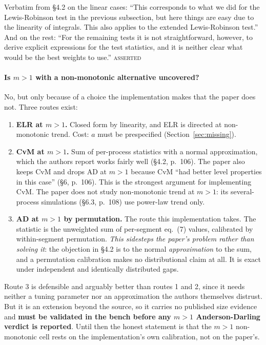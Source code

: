 \documentclass[11pt,a4paper]{article}
\newcommand{\ASSERTED}{\textsc{\textcolor{purple!70!black}{asserted}}}
\begin{document}
\medskip
\noindent
Verbatim from \S 4.2 on the linear cases: \enquote{This corresponds to what we did for the
Lewis-Robinson test in the previous subsection, but here things are easy due to the
linearity of integrals. This also applies to the extended Lewis-Robinson test.} And on
the rest: \enquote{For the remaining tests it is not straightforward, however, to derive
explicit expressions for the test statistics, and it is neither clear what would be the
best weights to use.} \ASSERTED

\paragraph{Is $m>1$ with a non-monotonic alternative uncovered?} No, but only because of
a choice the implementation makes that the paper does not. Three routes exist:

\begin{enumerate}[leftmargin=1.6em,itemsep=3pt]
\item \textbf{ELR at $m>1$.} Closed form by linearity, and ELR is directed at
non-monotonic trend. Cost: $a$ must be prespecified (Section~\ref{sec:missing}).
\item \textbf{CvM at $m>1$.} Sum of per-process statistics with a normal approximation,
which the authors report works fairly well (\S 4.2, p.~106). The paper also keeps CvM and
drops AD at $m>1$ because CvM \enquote{had better level properties in this case} (\S 6,
p.~106). This is the strongest argument for implementing CvM. The paper does not study
non-monotonic trend at $m>1$: its several-process simulations (\S 6.3, p.~108) use
power-law trend only.
\item \textbf{AD at $m>1$ by permutation.} The route this implementation takes. The
statistic is the unweighted sum of per-segment eq.~(7) values, calibrated by
within-segment permutation. \emph{This sidesteps the paper's problem rather than solving
it}: the objection in \S 4.2 is to the normal \emph{approximation} to the sum, and a
permutation calibration makes no distributional claim at all. It is exact under
independent and identically distributed gaps.
\end{enumerate}

\noindent
Route 3 is defensible and arguably better than routes 1 and 2, since it needs neither a
tuning parameter nor an approximation the authors themselves distrust. But it is an
extension beyond the source, so it carries no published size evidence and \textbf{must be
validated in the bench before any $m>1$ Anderson-Darling verdict is reported}. Until then
the honest statement is that the $m>1$ non-monotonic cell rests on the implementation's
own calibration, not on the paper's.
\end{document}
